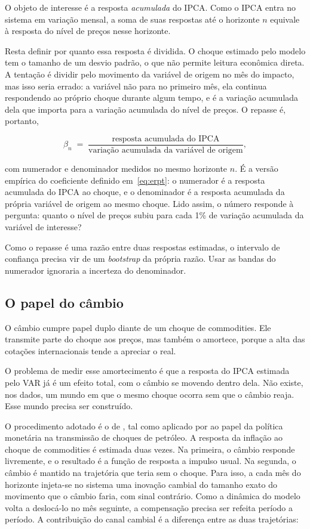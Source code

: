 \documentclass[12pt,openright,oneside,a4paper,portuguese,brazil]{abntex2}
\begin{document}
O objeto de interesse é a resposta \textit{acumulada} do IPCA. Como o IPCA
entra no sistema em variação mensal, a soma de suas respostas até o horizonte
$n$ equivale à resposta do nível de preços nesse horizonte.

Resta definir por quanto essa resposta é dividida. O choque estimado pelo
modelo tem o tamanho de um desvio padrão, o que não permite leitura econômica
direta.
A tentação é dividir pelo movimento da variável de origem no mês do impacto,
mas isso seria errado: a variável não para no primeiro mês, ela continua
respondendo ao próprio choque durante algum tempo, e é a variação acumulada
dela que importa para a variação acumulada do nível de preços. O repasse é,
portanto,

\begin{equation}
\beta_{n} \;=\;
\frac{\text{resposta acumulada do IPCA}}
     {\text{variação acumulada da variável de origem}} ,
\label{eq:repasse}
\end{equation}

\noindent com numerador e denominador medidos no mesmo horizonte $n$. É a
versão empírica do coeficiente definido em~\eqref{eq:erpt}: o numerador é a
resposta acumulada do IPCA ao choque, e o denominador é a resposta acumulada da
própria variável de origem ao mesmo choque. Lido assim, o número responde à
pergunta: quanto o nível de preços subiu para cada 1\% de variação acumulada
da variável de interesse?

Como o repasse é uma razão entre duas respostas estimadas, o intervalo de
confiança precisa vir de um \textit{bootstrap} da própria razão. Usar as
bandas do numerador ignoraria a incerteza do denominador.

\subsection{O papel do câmbio}
\label{sec:papelcambio}

O câmbio cumpre papel duplo diante de um choque de commodities. Ele transmite
parte do choque aos preços, mas também o amortece, porque a alta das cotações
internacionais tende a apreciar o real.

O problema de medir esse amortecimento é que a resposta do IPCA estimada pelo
VAR já é um efeito total, com o câmbio se movendo dentro dela. Não existe, nos
dados, um mundo em que o mesmo choque ocorra sem que o câmbio reaja. Esse mundo
precisa ser construído.

O procedimento adotado é o de , tal como aplicado por
 ao papel da política monetária na transmissão de
choques de petróleo. A resposta da inflação ao choque de commodities é estimada
duas vezes. Na primeira, o câmbio responde livremente, e o resultado é a função
de resposta a impulso usual. Na segunda, o câmbio é mantido na trajetória que
teria sem o choque. Para isso, a cada mês do horizonte injeta-se no sistema uma
inovação cambial do tamanho exato do movimento que o câmbio faria, com sinal
contrário. Como a dinâmica do modelo volta a deslocá-lo no mês seguinte, a
compensação precisa ser refeita período a período. A contribuição do canal
cambial é a diferença entre as duas trajetórias:
\end{document}
